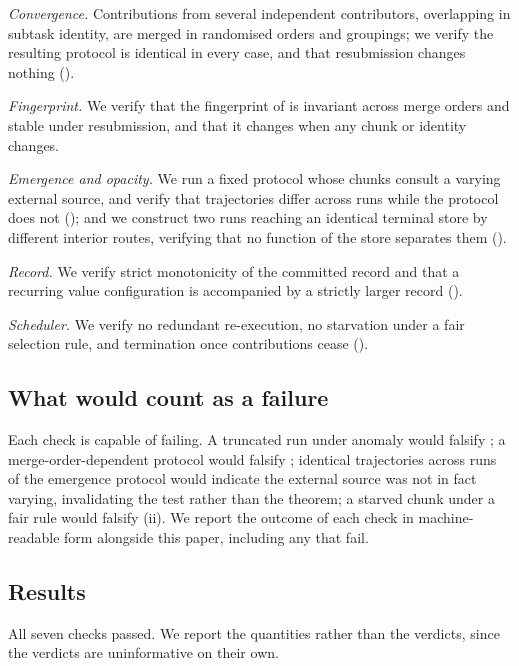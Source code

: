 \documentclass[11pt,a4paper]{article}
\theoremstyle{thmstyle}
\theoremstyle{definition}
\theoremstyle{remark}
\begin{document}
\emph{Convergence.} Contributions from several independent contributors,
overlapping in subtask identity, are merged in randomised orders and
groupings; we verify the resulting protocol is identical in every case, and
that resubmission changes nothing
().

\emph{Fingerprint.} We verify that the fingerprint of
 is invariant across merge orders and stable under
resubmission, and that it changes when any chunk or identity changes.

\emph{Emergence and opacity.} We run a fixed protocol whose chunks consult a
varying external source, and verify that trajectories differ across runs
while the protocol does not (); and we construct two
runs reaching an identical terminal store by different interior routes,
verifying that no function of the store separates them
().

\emph{Record.} We verify strict monotonicity of the committed record and
that a recurring value configuration is accompanied by a strictly larger
record ().

\emph{Scheduler.} We verify no redundant re-execution, no starvation under a
fair selection rule, and termination once contributions cease
().

\subsection{What would count as a failure}

Each check is capable of failing. A truncated run under anomaly would
falsify ; a merge-order-dependent protocol would
falsify ; identical trajectories across runs of
the emergence protocol would indicate the external source was not in fact
varying, invalidating the test rather than the theorem; a starved chunk
under a fair rule would falsify (ii). We report the
outcome of each check in machine-readable form alongside this paper,
including any that fail.




\subsection{Results}
\label{sec:results}

All seven checks passed. We report the quantities rather than the verdicts,
since the verdicts are uninformative on their own.
\end{document}

